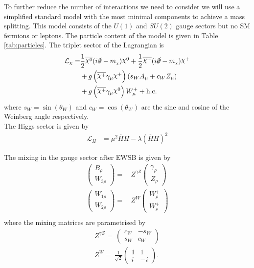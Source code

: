 \documentclass[11pt]{article}
\newcommand{\mychi}{\raisebox{0pt}[1ex][1ex]{\tiny$\chi$}}
\newcommand{\chiinline}{\raisebox{1.7pt}[1ex][1ex]{$\chi$}}
\def\mc{m_{\mychi}}
\begin{document}
To further reduce the number of interactions we need to consider we will use a simplified standard model with the most minimal components to achieve a mass splitting.  This model consists of the $U(1)$ and $SU(2)$ gauge sectors but no SM fermions or leptons.  The particle content of the model is given in Table \ref{tab:particles}.  The triplet sector of the Lagrangian is
\begin{align}
\begin{split}
\mathcal{L}_{\chi}=&\frac{1}{2}\overline{\chiinline^0}(i\slashed{\partial}-\mc)\chiinline^0+\frac{1}{2}\overline{\chiinline^+}(i\slashed{\partial}-\mc)\chiinline^{+}\\
&+g\left(\overline{\chiinline^+}\gamma_{\mu}\chiinline^+\right)\left(s_WA_{\mu}+c_WZ_{\mu}\right)\\
&+g\left(\overline{\chiinline^+}\gamma_{\mu}\chiinline^0 \right)W_{\mu}^++\text{h.c.}
\end{split}
\end{align}
where $s_W=\sin(\theta_W)$ and $c_W=\cos(\theta_W)$ are the sine and cosine of the Weinberg angle respectively.\\

The Higgs sector is given by
\begin{align}
\mathcal{L}_{H}&=\mu^2 \overline{H}H-\lambda(\overline{H}H)^2
\end{align}

The mixing in the gauge sector after EWSB is given by
\begin{align} 
\left(\begin{array}{c} 
B_{{\rho}}\\ 
W_{{3 \rho}}\end{array} \right) 
 = & \,Z^{\gamma Z}
\left(\begin{array}{c} 
\gamma_{{\rho}}\\ 
Z_{{\rho}}\end{array} \right) \\ 
\left(\begin{array}{c} 
W_{{1 \rho}}\\ 
W_{{2 \rho}}\end{array} \right) 
 = & \,Z^{W}
\left(\begin{array}{c} 
W^+_{{\rho}}\\ 
W^+_{{\rho}}\end{array} \right) \\ 
\end{align} 
where the mixing matrices are parametrised by \\ 
\begin{align} 
Z^{\gamma Z}= \, \left( 
\begin{array}{cc} 
c_W  & - s_W   \\ 
 s_W  & c_W \end{array} 
\right) \\ 
Z^{W}= \,\frac{1}{\sqrt{2}}  \left( 
\begin{array}{cc} 
1& 1 \\ 
 i   & -i  \end{array} 
\right). \\ 
\end{align} 
\end{document}
